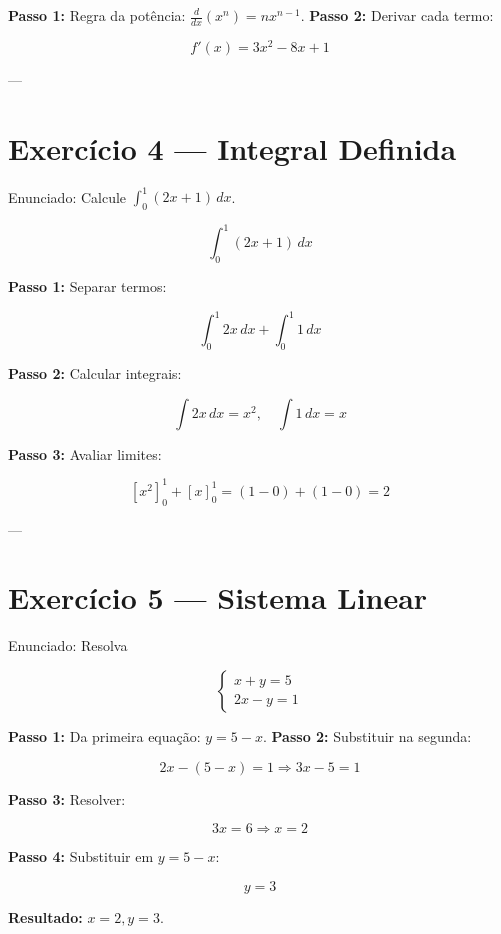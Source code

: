 \textbf{Passo 1:} Regra da potência: \(\frac{d}{dx}(x^n) = nx^{n-1}\).  
\textbf{Passo 2:} Derivar cada termo:


\[
f'(x) = 3x^2 - 8x + 1
\]



---

\section*{Exercício 4 — Integral Definida}
Enunciado: Calcule \(\int_0^1 (2x+1)\,dx\).



\[
\int_0^1 (2x+1)\,dx
\]



\textbf{Passo 1:} Separar termos:


\[
\int_0^1 2x\,dx + \int_0^1 1\,dx
\]


\textbf{Passo 2:} Calcular integrais:


\[
\int 2x\,dx = x^2, \quad \int 1\,dx = x
\]


\textbf{Passo 3:} Avaliar limites:


\[
[x^2]_0^1 + [x]_0^1 = (1-0) + (1-0) = 2
\]



---

\section*{Exercício 5 — Sistema Linear}
Enunciado: Resolva


\[
\begin{cases}
x + y = 5 \\
2x - y = 1
\end{cases}
\]



\textbf{Passo 1:} Da primeira equação: \(y = 5 - x\).  
\textbf{Passo 2:} Substituir na segunda:


\[
2x - (5 - x) = 1 \Rightarrow 3x - 5 = 1
\]


\textbf{Passo 3:} Resolver:


\[
3x = 6 \Rightarrow x = 2
\]


\textbf{Passo 4:} Substituir em \(y = 5 - x\):


\[
y = 3
\]



\textbf{Resultado:} \(x=2, y=3\).
